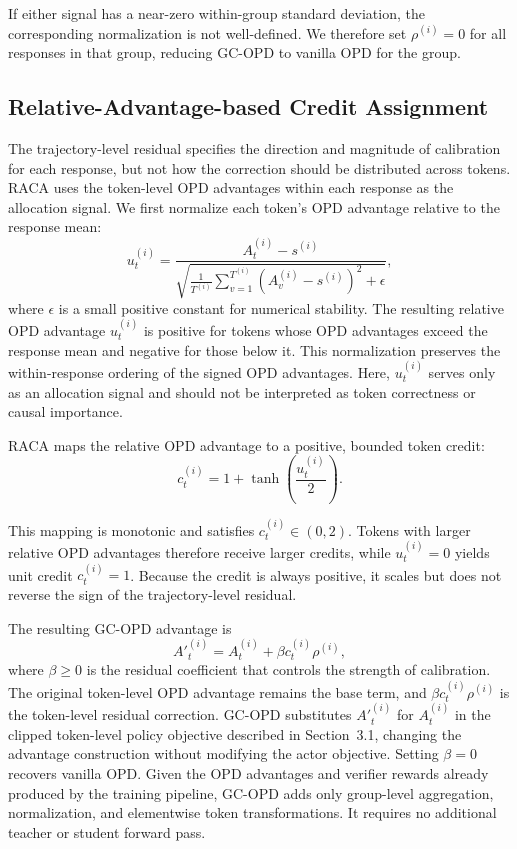 If either signal has a near-zero within-group standard deviation, the corresponding normalization is not well-defined. We therefore set $\rho^{(i)}=0$ for all responses in that group, reducing GC-OPD to vanilla OPD for the group.

\subsection{Relative-Advantage-based Credit Assignment}

The trajectory-level residual specifies the direction and magnitude of calibration for each response, but not how the correction should be distributed across tokens. RACA uses the token-level OPD advantages within each response as the allocation signal. We first normalize each token's OPD advantage relative to the response mean:
\begin{equation}
u^{(i)}_t=
\frac{A^{(i)}_t-s^{(i)}}
{\sqrt{\frac{1}{T^{(i)}}\sum_{v=1}^{T^{(i)}}
\left(A^{(i)}_v-s^{(i)}\right)^2+\epsilon}},
\end{equation}
where $\epsilon$ is a small positive constant for numerical stability. The resulting relative OPD advantage $u^{(i)}_t$ is positive for tokens whose OPD advantages exceed the response mean and negative for those below it. This normalization preserves the within-response ordering of the signed OPD advantages. Here, $u^{(i)}_t$ serves only as an allocation signal and should not be interpreted as token correctness or causal importance.

RACA maps the relative OPD advantage to a positive, bounded token credit:
\begin{equation}
c^{(i)}_t=1+\tanh\left(\frac{u^{(i)}_t}{2}\right).
\label{eq:raca}
\end{equation}

This mapping is monotonic and satisfies $c^{(i)}_t\in(0,2)$. Tokens with larger relative OPD advantages therefore receive larger credits, while $u^{(i)}_t=0$ yields unit credit $c^{(i)}_t=1$. Because the credit is always positive, it scales but does not reverse the sign of the trajectory-level residual.

The resulting GC-OPD advantage is
\begin{equation}
A'^{(i)}_t=
A^{(i)}_t+\beta c^{(i)}_t\rho^{(i)},
\label{eq:gc-opd-advantage}
\end{equation}
where $\beta\geq0$ is the residual coefficient that controls the strength of calibration. The original token-level OPD advantage remains the base term, and $\beta c^{(i)}_t\rho^{(i)}$ is the token-level residual correction. GC-OPD substitutes $A'^{(i)}_t$ for $A^{(i)}_t$ in the clipped token-level policy objective described in Section~3.1, changing the advantage construction without modifying the actor objective. Setting $\beta=0$ recovers vanilla OPD. Given the OPD advantages and verifier rewards already produced by the training pipeline, GC-OPD adds only group-level aggregation, normalization, and elementwise token transformations. It requires no additional teacher or student forward pass.
